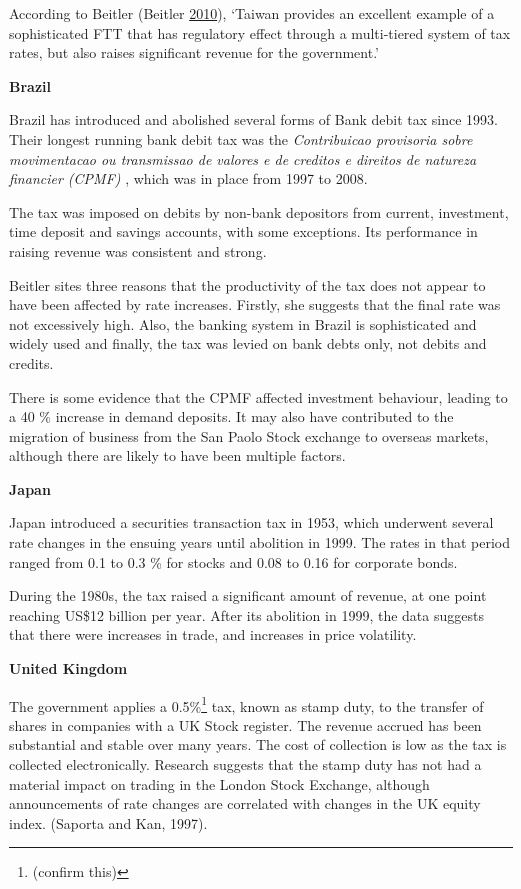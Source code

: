 \documentclass[]{tufte-handout}
\begin{document}
According to Beitler (Beitler
\protect\hyperlink{ref-Beitler2010}{2010}), `Taiwan provides an
excellent example of a sophisticated FTT that has regulatory effect
through a multi-tiered system of tax rates, but also raises significant
revenue for the government.'

\textbf{Brazil}

Brazil has introduced and abolished several forms of Bank debit tax
since 1993. Their longest running bank debit tax was the
\emph{Contribuicao provisoria sobre movimentacao ou transmissao de
valores e de creditos e direitos de natureza financier (CPMF)} , which
was in place from 1997 to 2008.

The tax was imposed on debits by non-bank depositors from current,
investment, time deposit and savings accounts, with some exceptions. Its
performance in raising revenue was consistent and strong.

Beitler sites three reasons that the productivity of the tax does not
appear to have been affected by rate increases. Firstly, she suggests
that the final rate was not excessively high. Also, the banking system
in Brazil is sophisticated and widely used and finally, the tax was
levied on bank debts only, not debits and credits.

There is some evidence that the CPMF affected investment behaviour,
leading to a 40 \% increase in demand deposits. It may also have
contributed to the migration of business from the San Paolo Stock
exchange to overseas markets, although there are likely to have been
multiple factors.

\textbf{Japan}

Japan introduced a securities transaction tax in 1953, which underwent
several rate changes in the ensuing years until abolition in 1999. The
rates in that period ranged from 0.1 to 0.3 \% for stocks and 0.08 to
0.16 for corporate bonds.

During the 1980s, the tax raised a significant amount of revenue, at one
point reaching US\$12 billion per year. After its abolition in 1999, the
data suggests that there were increases in trade, and increases in price
volatility.

\textbf{United Kingdom}

The government applies a 0.5\%\footnote{(confirm this)} tax, known as
stamp duty, to the transfer of shares in companies with a UK Stock
register. The revenue accrued has been substantial and stable over many
years. The cost of collection is low as the tax is collected
electronically. Research suggests that the stamp duty has not had a
material impact on trading in the London Stock Exchange, although
announcements of rate changes are correlated with changes in the UK
equity index. (Saporta and Kan, 1997).
\end{document}
